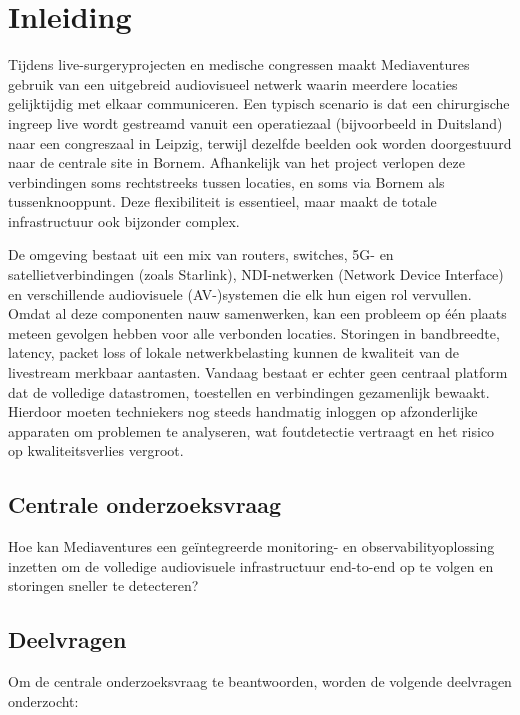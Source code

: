 
\section{Inleiding}
\label{sec:inleiding}

Tijdens live-surgeryprojecten en medische congressen maakt Mediaventures gebruik van een uitgebreid audiovisueel netwerk waarin meerdere locaties gelijktijdig met elkaar communiceren. Een typisch scenario is dat een chirurgische ingreep live wordt gestreamd vanuit een operatiezaal (bijvoorbeeld in Duitsland) naar een congreszaal in Leipzig, terwijl dezelfde beelden ook worden doorgestuurd naar de centrale site in Bornem. Afhankelijk van het project verlopen deze verbindingen soms rechtstreeks tussen locaties, en soms via Bornem als tussenknooppunt. Deze flexibiliteit is essentieel, maar maakt de totale infrastructuur ook bijzonder complex.

De omgeving bestaat uit een mix van routers, switches, 5G- en satellietverbindingen (zoals Starlink), NDI-netwerken (Network Device Interface) en verschillende audiovisuele (AV-)systemen die elk hun eigen rol vervullen. Omdat al deze componenten nauw samenwerken, kan een probleem op één plaats meteen gevolgen hebben voor alle verbonden locaties. Storingen in bandbreedte, latency, packet loss of lokale netwerkbelasting kunnen de kwaliteit van de livestream merkbaar aantasten. Vandaag bestaat er echter geen centraal platform dat de volledige datastromen, toestellen en verbindingen gezamenlijk bewaakt. Hierdoor moeten techniekers nog steeds handmatig inloggen op afzonderlijke apparaten om problemen te analyseren, wat foutdetectie vertraagt en het risico op kwaliteitsverlies vergroot.

\subsection{Centrale onderzoeksvraag}

Hoe kan Mediaventures een geïntegreerde monitoring- en observability\-op\-los\-sing inzetten om de volledige audiovisuele infrastructuur end-to-end op te volgen en storingen sneller te detecteren?

\subsection{Deelvragen}

Om de centrale onderzoeksvraag te beantwoorden, worden de volgende deelvragen onderzocht:

